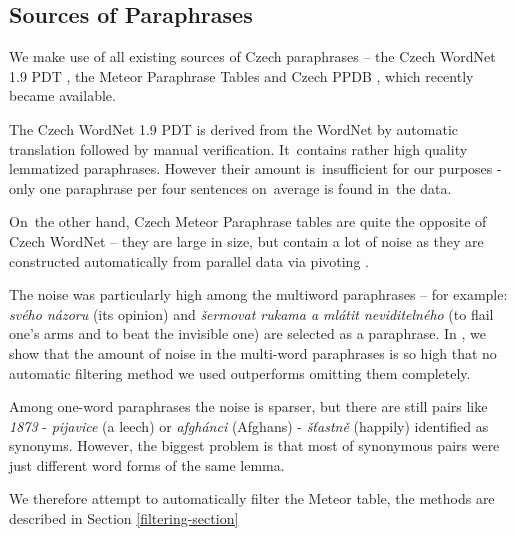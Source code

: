 \documentclass[11pt]{article}
\def\Tref#1{Table~\ref{#1}}
\begin{document}
\subsection{Sources of Paraphrases}
\label{meteori}
We make use of all existing sources of Czech paraphrases -- the Czech WordNet 1.9 PDT 
\cite{czech-wordnet}, the Meteor Paraphrase Tables \cite{meteor-tables} and Czech PPDB %
, which recently became available.

The Czech WordNet 1.9 PDT is derived from the WordNet \cite{wordnet} by automatic translation 
followed by manual verification. It~contains rather high quality lemmatized paraphrases. However 
their amount is~insufficient for our purposes %
- only one paraphrase per four sentences on~average is found in~the data. %

On~the other hand, Czech Meteor Paraphrase tables are quite the opposite of Czech WordNet -- 
they are large in size, but contain a lot of noise as they are constructed automatically 
from parallel data via pivoting \cite{pivoting}. 

The noise was particularly high among the multiword paraphrases -- for example: \textit{svého názoru} 
(its opinion) and \textit{šermovat rukama a mlátit neviditelného} (to flail one's arms and to beat 
the invisible one) are selected as a paraphrase. In , we show that the amount 
of noise in the multi-word paraphrases is so high that no automatic filtering method we used outperforms 
omitting them completely.

Among one-word paraphrases the noise is sparser, but there are still pairs like \textit{1873} - 
\textit{pijavice} (a leech) or \textit{afgh\'{a}nci} (Afghans) - \textit{š\v{t}astně} (happily) 
identified as synonyms. However, the biggest problem is that most of synonymous pairs were just 
different word forms of the same lemma. 

We therefore attempt to automatically filter the Meteor table, the methods are described in Section 
\ref{filtering-section}


\end{document}

